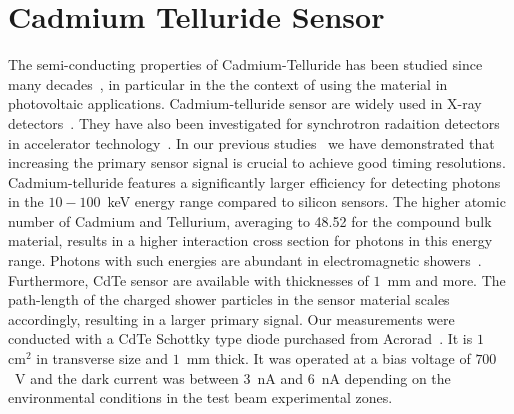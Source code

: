 %
%
%
\section{Cadmium Telluride Sensor}
\label{sec:siliconpad}
The semi-conducting properties of Cadmium-Telluride has been studied since many decades~\cite{cdtegeneric}, 
in particular in the the context of using the material in photovoltaic applications.
Cadmium-telluride sensor are widely used in X-ray detectors~\cite{cdtesensorsgeneric,cdtesensors2,cdtesensors3}. 
They have also been investigated for synchrotron radaition detectors in accelerator technology~\cite{cdtelhc}.   
In our previous 
studies~\cite{Anderson:2015gha,MCPShowerMaxPaper,Ronzhin201552,SiliconTiming,PixelatedMCP,Anderson:2016ygg,Anderson:2015tia} 
we have demonstrated that increasing the primary sensor signal is crucial to achieve good timing resolutions.  
Cadmium-telluride features a significantly larger efficiency for detecting photons in the $10-100$~keV energy range 
compared to silicon sensors. The higher atomic number of Cadmium and Tellurium, averaging to 48.52 for the 
compound bulk material, results in a higher interaction cross section for photons in this energy range. 
Photons with such energies are abundant in electromagnetic showers~\cite{showercomposition}. 
Furthermore, CdTe sensor are available with thicknesses of $1$~mm and more. 
The path-length of the charged shower particles in the sensor material scales accordingly, 
resulting in a larger primary signal.
%
Our measurements were conducted with a CdTe Schottky type diode purchased from Acrorad~\cite{acrorad}. 
It is $1$~$\mathrm{cm}^{2}$ in transverse size and $1$~mm thick.
It was operated at a bias voltage of $700$~V and the dark current was between $3$~nA 
and $6$~nA depending on the environmental conditions in the test beam experimental 
zones.     
%
